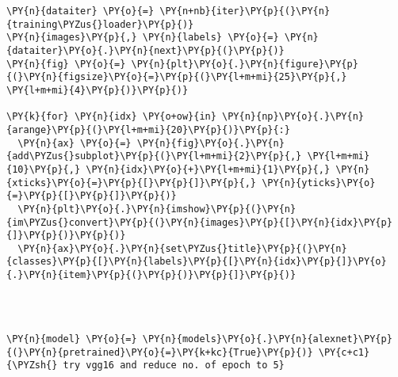    \begin{tcolorbox}[breakable, size=fbox, boxrule=1pt, pad at break*=1mm,colback=cellbackground, colframe=cellborder]
\begin{Verbatim}[commandchars=\\\{\}]
\PY{n}{dataiter} \PY{o}{=} \PY{n+nb}{iter}\PY{p}{(}\PY{n}{training\PYZus{}loader}\PY{p}{)}
\PY{n}{images}\PY{p}{,} \PY{n}{labels} \PY{o}{=} \PY{n}{dataiter}\PY{o}{.}\PY{n}{next}\PY{p}{(}\PY{p}{)}
\PY{n}{fig} \PY{o}{=} \PY{n}{plt}\PY{o}{.}\PY{n}{figure}\PY{p}{(}\PY{n}{figsize}\PY{o}{=}\PY{p}{(}\PY{l+m+mi}{25}\PY{p}{,} \PY{l+m+mi}{4}\PY{p}{)}\PY{p}{)}

\PY{k}{for} \PY{n}{idx} \PY{o+ow}{in} \PY{n}{np}\PY{o}{.}\PY{n}{arange}\PY{p}{(}\PY{l+m+mi}{20}\PY{p}{)}\PY{p}{:}
  \PY{n}{ax} \PY{o}{=} \PY{n}{fig}\PY{o}{.}\PY{n}{add\PYZus{}subplot}\PY{p}{(}\PY{l+m+mi}{2}\PY{p}{,} \PY{l+m+mi}{10}\PY{p}{,} \PY{n}{idx}\PY{o}{+}\PY{l+m+mi}{1}\PY{p}{,} \PY{n}{xticks}\PY{o}{=}\PY{p}{[}\PY{p}{]}\PY{p}{,} \PY{n}{yticks}\PY{o}{=}\PY{p}{[}\PY{p}{]}\PY{p}{)}
  \PY{n}{plt}\PY{o}{.}\PY{n}{imshow}\PY{p}{(}\PY{n}{im\PYZus{}convert}\PY{p}{(}\PY{n}{images}\PY{p}{[}\PY{n}{idx}\PY{p}{]}\PY{p}{)}\PY{p}{)}
  \PY{n}{ax}\PY{o}{.}\PY{n}{set\PYZus{}title}\PY{p}{(}\PY{n}{classes}\PY{p}{[}\PY{n}{labels}\PY{p}{[}\PY{n}{idx}\PY{p}{]}\PY{o}{.}\PY{n}{item}\PY{p}{(}\PY{p}{)}\PY{p}{]}\PY{p}{)}
  
\end{Verbatim}
\end{tcolorbox}

    \begin{center}
    \end{center}
    { \hspace*{\fill} \\}
    
    \begin{tcolorbox}[breakable, size=fbox, boxrule=1pt, pad at break*=1mm,colback=cellbackground, colframe=cellborder]
\begin{Verbatim}[commandchars=\\\{\}]
\PY{n}{model} \PY{o}{=} \PY{n}{models}\PY{o}{.}\PY{n}{alexnet}\PY{p}{(}\PY{n}{pretrained}\PY{o}{=}\PY{k+kc}{True}\PY{p}{)} \PY{c+c1}{\PYZsh{} try vgg16 and reduce no. of epoch to 5}
\end{Verbatim}
\end{tcolorbox}

